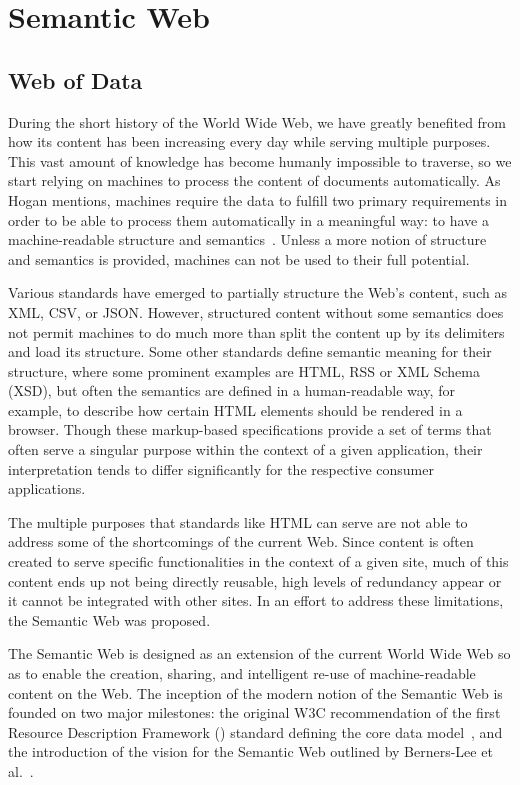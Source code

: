 \section{Semantic Web}
\label{cap2:semWeb}

\subsection{Web of Data}
\label{cap2:semWeb/webOfData}
During the short history of the World Wide Web, we have greatly benefited from how its 
content has been increasing every day while serving multiple purposes. This vast amount of 
knowledge has become humanly impossible to traverse, so we start relying on machines to 
process the content of documents automatically. As Hogan mentions, machines require the 
data to fulfill two primary requirements in order to be able to process them automatically 
in a meaningful way: to have a machine-readable structure and semantics~\cite{key:linked14-Hogan}. 
Unless a more  notion of structure and semantics is provided, machines can not 
be used to their full potential.

Various standards have emerged to partially structure the Web’s content, such as XML, CSV, 
or JSON. However, structured content without some semantics does not permit machines to do 
much more than split the content up by its delimiters and load its structure. Some other 
standards define semantic meaning for their structure, where some prominent examples are 
HTML, RSS or XML Schema (XSD), but often the semantics are defined in a human-readable way, 
for example, to describe how certain HTML elements should be rendered in a browser. Though 
these markup-based specifications provide a set of terms that often serve a singular purpose 
within the context of a given application, their interpretation tends to differ significantly 
for the respective consumer applications. 

The multiple purposes that standards like HTML can serve are not able to address some of the 
shortcomings of the current Web. Since content is often created to serve specific functionalities 
in the context of a given site, much of this content ends up not being directly reusable, 
high levels of redundancy appear or it cannot be integrated with other sites. In an effort 
to address these limitations, the Semantic Web was proposed.

The Semantic Web is designed as an extension of the current World Wide Web so as to enable 
the creation, sharing, and intelligent re-use of machine-readable content on the Web. The 
inception of the modern notion of the Semantic Web is founded on two major milestones: the 
original W3C recommendation of the first Resource Description Framework (\RDF{}) standard 
defining the core data model~\cite{key:oldrdf}, and the introduction of the vision for the 
Semantic Web outlined by Berners-Lee et al.~\cite{key:semwebsa}.

